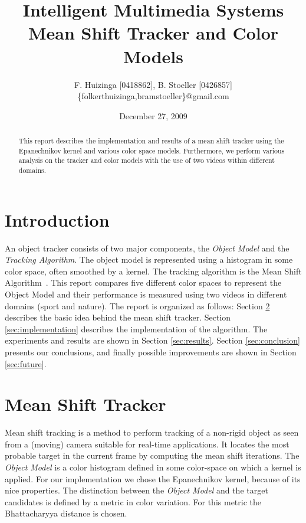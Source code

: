 \documentclass[11pt]{article}
\title{Intelligent Multimedia Systems \\ Mean Shift Tracker and Color Models}
\author{F. Huizinga [0418862], B. Stoeller [0426857] \\
      \{folkerthuizinga,bramstoeller\}@gmail.com}
\date{December 27, 2009}
\begin{document}
\maketitle

\begin{abstract}
This report describes the implementation and results of a mean shift tracker
using the Epanechnikov kernel and various color space models. Furthermore, we
perform various analysis on the tracker and color models with the use of two
videos within different domains.
\end{abstract}


\section{Introduction} \label{sec:intro}
An object tracker consists of two major components, the \emph{Object Model} and
the \emph{Tracking Algorithm}. The object model is represented using a
histogram in some color space, often smoothed by a kernel. The tracking
algorithm is the Mean Shift Algorithm~\cite{kernel-basedobject,
real-timetracking}. This report compares five different color spaces to
represent the Object Model and their performance is measured using two videos
in different domains (sport and nature). The report is organized as follows:
Section \ref{sec:meanshift} describes the basic idea behind the mean shift
tracker. Section \ref{sec:implementation} describes the implementation of the
algorithm. The experiments and results are shown in Section \ref{sec:results}.
Section \ref{sec:conclusion} presents our conclusions, and finally possible
improvements are shown in Section \ref{sec:future}.

\section{Mean Shift Tracker} \label{sec:meanshift}
Mean shift tracking is a method to perform tracking of a non-rigid object as
seen from a (moving) camera suitable for real-time applications. It locates the
most probable target in the current frame by computing the mean shift
iterations. The \emph{Object Model} is a color histogram defined in some
color-space on which a kernel is applied. For our implementation we chose the
Epanechnikov kernel, because of its nice properties. The distinction between
the \emph{Object Model} and the target candidates is defined by a metric in
color variation. For this metric the Bhattacharyya distance is chosen. 
\end{document}
